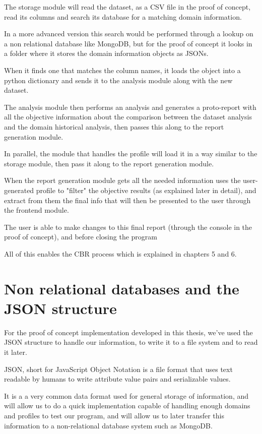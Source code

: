 The storage module will read the dataset, as a CSV file in the proof of concept, read its columns and search its database for a matching domain information.

In a more advanced version this search would be performed through a lookup on a non relational database like MongoDB, but for the proof of concept it looks in a folder where it stores the domain information objects as JSONs.

When it finds one that matches the column names, it loads the object into a python dictionary and sends it to the analysis module along with the new dataset.

The analysis module then performs an analysis and generates a proto-report with all the objective information about the comparison between the dataset analysis and the domain historical analysis, then passes this along to the report generation module.

In parallel, the module that handles the profile will load it in a way similar to the storage module, then pass it along to the report generation module.

When the report generation module gets all the needed information uses the user-generated profile to "filter" the objective results (as explained later in detail), and extract from them the final info that will then be presented to the user through the frontend module.

The user is able to make changes to this final report (through the console in the proof of concept), and before closing the program

All of this enables the CBR process which is explained in chapters 5 and 6.

\section{Non relational databases and the JSON structure}
\label{cap2:sec:jsonfiller}

For the proof of concept implementation developed in this thesis, we've used the JSON structure to handle our information, to write it to a file system and to read it later.

JSON, short for JavaScript Object Notation is a file format that uses text readable by humans to write attribute value pairs and serializable values. 

It is a a very common data format used for general storage of information, and will allow us to do a quick implementation capable of handling enough domains and profiles to test our program, and will allow us to later transfer this information to a non-relational database system such as MongoDB.


